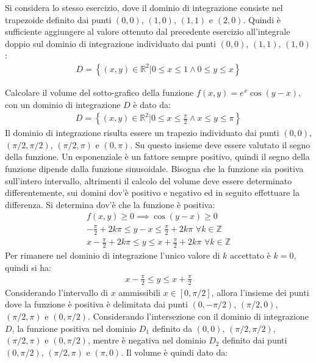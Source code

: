 \documentclass{article}
\numberwithin{equation}{subsection}
\begin{document}
Si considera lo stesso esercizio, dove il dominio di integrazione consiste nel trapezoide definito dai punti $(0,0)$, $(1,0)$, $(1,1)$ e $(2,0)$. Quindi è sufficiente aggiungere al valore ottenuto dal precedente esercizio all'integrale doppio sul dominio di integrazione individuato dai punti $(0,0)$, $(1,1)$, $(1,0)$:
\begin{gather*}
    D=\left\{(x,y)\in\mathbb{R}^2\big| 0\leq x\leq1\land 0\leq y\leq x\right\}
\end{gather*}


Calcolare il volume del sotto-grafico della funzione $f(x,y)=e^x\cos(y-x)$, con un dominio di integrazione $D$ è dato da:
\begin{gather*}
    D=\left\{(x,y)\in\mathbb{R}^2\big|0\leq x\leq\frac{\pi}{2}\land x\leq y\leq\pi\right\}
\end{gather*}
Il dominio di integrazione risulta essere un trapezio individuato dai punti $(0,0)$, $(\pi/2, \pi/2)$, $(\pi/2,\pi)$ e $(0,\pi)$. Su questo insieme deve essere valutato il segno della funzione. Un esponenziale è un fattore sempre positivo, quindi il segno della funzione dipende dalla funzione sinusoidale. Bisogna che la funzione sia positiva sull'intero intervallo, altrimenti il calcolo del volume deve essere determinato differentemente, sui domini dov'è positivo e negativo ed in seguito effettuare la differenza. Si determina dov'è che la funzione è positiva:
\begin{gather*}
    f(x,y)\geq0\implies \cos(y-x)\geq0\\
    -\frac{\pi}{2}+2k\pi\leq y-x\leq\frac{\pi}{2}+2k\pi\,\,\forall k\in\mathbb{Z}\\
    x-\frac{\pi}{2}+2k\pi\leq y\leq x+\frac{\pi}{2}+2k\pi\,\,\forall k\in\mathbb{Z}
\end{gather*}
Per rimanere nel dominio di integrazione l'unico valore di $k$ accettato è $k=0$, quindi si ha:
\begin{gather*}
    x-\frac{\pi}{2}\leq y\leq x+\frac{\pi}{2}
\end{gather*}
Considerando l'intervallo di $x$ ammissibili $x\in[0,\pi/2]$, allora l'insieme dei punti dove la funzione è positiva è delimitata dai punti $(0,-\pi/2)$, $(\pi/2,0)$, $(\pi/2,\pi)$ e $(0,\pi/2)$. Considerando l'intersezione con il dominio di integrazione $D$, la funzione positiva nel dominio $D_1$ definito da $(0,0)$, $(\pi/2,\pi/2)$, $(\pi/2,\pi)$ e $(0,\pi/2)$, mentre è negativa nel dominio $D_2$ definito dai punti $(0,\pi/2)$, $(\pi/2,\pi)$ e $(\pi,0)$. Il volume è quindi dato da:
\end{document}
